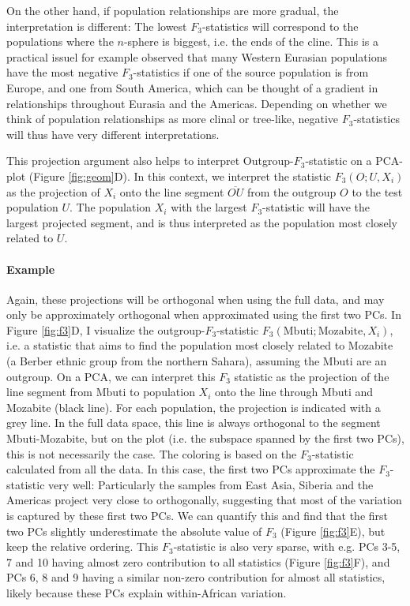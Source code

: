 \documentclass[12pt,fullpage, a4paper]{article}
\begin{document}
On the other hand, if population relationships are more gradual, the interpretation is different: The lowest $F_3$-statistics will correspond to the populations where the $n$-sphere is biggest, i.e. the ends of the cline.  This is a practical issuel for example \cite{patterson2012} observed that many Western Eurasian populations have the most negative $F_3$-statistics if one of the source population is from Europe, and one from South America, which can be thought of a gradient in relationships throughout Eurasia and the Americas. Depending on whether we think of population relationships as more clinal or tree-like, negative $F_3$-statistics will thus have very different interpretations.

This projection argument also helps to interpret Outgroup-$F_3$-statistic on a PCA-plot (Figure \ref{fig:geom}D). In this context, we interpret the statistic $F_3(O; U, X_i)$ as the projection of $X_i$ onto the line segment $\overline{OU}$ from the outgroup $O$ to the test population $U$. The population $X_i$ with the largest $F_3$-statistic will have the largest projected segment, and is thus interpreted as the population most closely related to $U$. 

\paragraph{Example}
Again, these projections will be orthogonal when using the full data, and may only be approximately orthogonal when approximated using the first two PCs. In Figure \ref{fig:f3}D, I visualize the outgroup-$F_3$-statistic $F_3(\text{Mbuti}; \text{Mozabite}, X_i)$, i.e. a statistic that aims to find the population most closely related to Mozabite (a Berber ethnic group from the northern Sahara), assuming the Mbuti are an outgroup. On a PCA, we can interpret this $F_3$ statistic as the projection of the line segment from $\text{Mbuti}$ to population $X_i$ onto the line through Mbuti and Mozabite (black line). For each population, the projection is indicated with a grey line. In the full data space, this line is always orthogonal to the segment Mbuti-Mozabite, but on the plot (i.e. the subspace spanned by the first two PCs), this is not necessarily the case.  The coloring is based on the $F_3$-statistic calculated from all the data. In this case, the first two PCs approximate the $F_3$-statistic very well: Particularly the samples from East Asia, Siberia and the Americas project very close to orthogonally, suggesting that most of the variation is captured by these first two PCs.  We can quantify this and find that the first two PCs slightly underestimate the absolute value of $F_3$ (Figure \ref{fig:f3}E), but keep the relative ordering. This $F_3$-statistic is also very sparse, with e.g. PCs 3-5, 7 and 10 having almost zero contribution to all statistics (Figure \ref{fig:f3}F), and PCs 6, 8 and 9 having a similar non-zero contribution for almost all statistics, likely because these PCs explain within-African variation.
\end{document}
